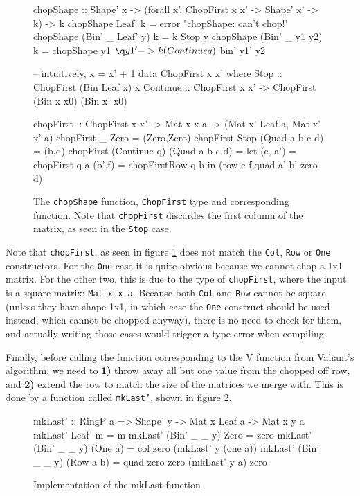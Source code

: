 \documentclass[a4paper,12pt,notitlepage]{report}
\begin{document}
\begin{figure}[H]
\begin{code}
chopShape :: Shape' x 
          -> (forall x'. ChopFirst x x' -> Shape' x' -> k) -> k
chopShape Leaf' k = error "chopShape: can't chop!"
chopShape (Bin' _ Leaf' y) k = k Stop y
chopShape (Bin' _ y1 y2) k = 
    chopShape y1 $ \q y1' -> k (Continue q) $ bin' y1' y2

-- intuitively, x = x' + 1
data ChopFirst x x' where
  Stop :: ChopFirst (Bin Leaf x) x
  Continue :: ChopFirst x x' -> ChopFirst (Bin x x0) (Bin x' x0)

chopFirst :: ChopFirst x x' -> Mat x x a  
                            -> (Mat x' Leaf a, Mat x' x' a)
chopFirst _ Zero = (Zero,Zero)
chopFirst Stop (Quad a b c d) = (b,d)
chopFirst (Continue q) (Quad a b c d) =
  let  (e, a') = chopFirst q a
       (b',f)  = chopFirstRow q b
  in (row e f,quad a' b' zero d)
\end{code}
\caption{\label{chopfirst} The \texttt{chopShape} function, \texttt{ChopFirst}
type and corresponding function. Note that \texttt{chopFirst} discardes the
first column of the matrix, as seen in the \texttt{Stop} case.}
\end{figure}

Note that \texttt{chopFirst}, as seen in figure \ref{chopfirst} does not match
the \texttt{Col}, \texttt{Row} or \texttt{One} constructors. For the
\texttt{One} case it is quite obvious because we cannot chop a 1x1 matrix. For
the other two, this is due to the type of \texttt{chopFirst}, where the input is
a square matrix: \texttt{Mat x x a}. Because both \texttt{Col} and \texttt{Row}
cannot be square (unless they have shape 1x1, in which case the \texttt{One}
construct should be used instead, which cannot be chopped anyway), there is no
need to check for them, and actually writing those cases would trigger a type
error when compiling.

Finally, before calling the function corresponding to the V function from
Valiant's algorithm, we need to \textbf{1)} throw away all but one value from
the chopped off row, and \textbf{2)} extend the row to match the size of the
matrices we merge with. This is done by a function called \texttt{mkLast'},
shown in figure \ref{mklast}.

\begin{figure}[H]
\begin{code}
mkLast' :: RingP a => Shape' y -> Mat x Leaf a -> Mat x y a
mkLast' Leaf' m = m
mkLast' (Bin' _ _ y) Zero = zero
mkLast' (Bin' _ _ y) (One a) = col zero (mkLast' y (one a))
mkLast' (Bin' _ _ y) (Row a b) = quad zero zero (mkLast' y a) zero
\end{code}
\caption{\label{mklast}Implementation of the mkLast function}
\end{figure}
\end{document}
